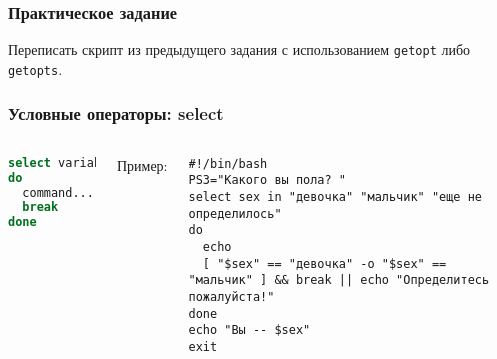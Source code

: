 \begin{frame}
\frametitle{Практическое задание}
Переписать скрипт из предыдущего задания с использованием {\tt getopt} либо {\tt getopts}.
\end{frame}

\begin{frame}[fragile]
\frametitle{Условные операторы: select}

	\small
	\begin{columns}

		\begin{lstlisting}[language=sh,frame=single]
select variable [in list]
do
  command...
  break
done 
		\end{lstlisting}
		\pause
		{\normalsize Пример:}

		\begin{lstlisting}
#!/bin/bash
PS3="Какого вы пола? "
select sex in "девочка" "мальчик" "еще не определилось"
do
  echo
  [ "$sex" == "девочка" -o "$sex" == "мальчик" ] && break || echo "Определитесь пожалуйста!"
done
echo "Вы -- $sex"
exit
		\end{lstlisting}

		\pause

	\end{columns}
\end{frame}


